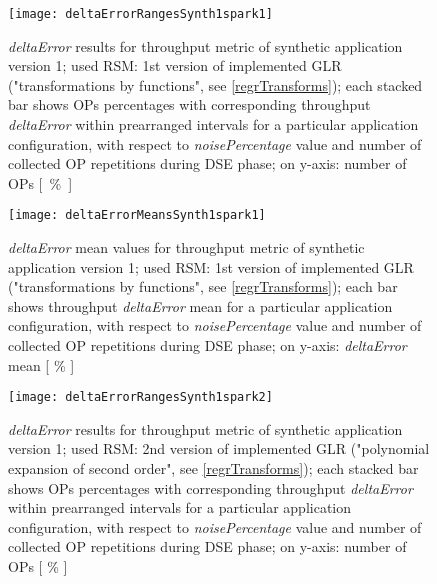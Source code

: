 \begin{figure}[H]

    \centering
    
    \texttt{[image: deltaErrorRangesSynth1spark1]}
    
     \caption{\textit{deltaError} results for throughput metric of synthetic application version 1; used RSM: 1st version of implemented GLR ("transformations by functions", see \ref{regrTransforms}); each stacked bar shows OPs percentages with corresponding throughput \textit{deltaError} within prearranged intervals for a particular application configuration, with respect to \textit{noisePercentage} value and number of collected OP repetitions during DSE phase; on y-axis: number of OPs \hbox{[ \% ]}}
    
    \label{fig::synth1spark1::intervals}
    
\end{figure}

\begin{figure}[H]

    \centering
    
    \texttt{[image: deltaErrorMeansSynth1spark1]}
    
    \caption{\textit{deltaError} mean values for throughput metric of synthetic application version 1; used RSM: 1st version of implemented GLR ("transformations by functions", see \ref{regrTransforms}); each bar shows throughput \textit{deltaError} mean for a particular application configuration, with respect to \textit{noisePercentage} value and number of collected OP repetitions during DSE phase; on y-axis: \textit{deltaError} mean [ \% ]}
    
    \label{fig::synth1spark1::means}
    
\end{figure}





\begin{figure}[H]

    \centering
    
    \texttt{[image: deltaErrorRangesSynth1spark2]}
    
     \caption{\textit{deltaError} results for throughput metric of synthetic application version 1; used RSM: 2nd version of implemented GLR ("polynomial expansion of second order", see \ref{regrTransforms}); each stacked bar shows OPs percentages with corresponding throughput \textit{deltaError} within prearranged intervals for a particular application configuration, with respect to \textit{noisePercentage} value and number of collected OP repetitions during DSE phase; on y-axis: number of OPs [ \% ]}
    
    \label{fig::synth1spark2::intervals}
    
\end{figure}

